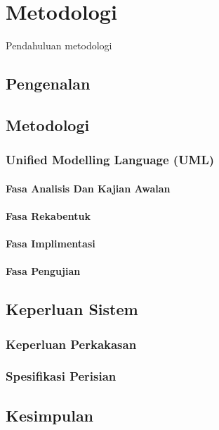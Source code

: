 \chapter{Metodologi}\label{c1}
Pendahuluan metodologi

\section{Pengenalan}

\section{Metodologi}

\subsection{Unified Modelling Language (UML)}

\subsubsection{Fasa Analisis Dan Kajian Awalan}
\subsubsection{Fasa Rekabentuk}
\subsubsection{Fasa Implimentasi}
\subsubsection{Fasa Pengujian}

\section{Keperluan Sistem}

\subsection{Keperluan Perkakasan}
\subsection{Spesifikasi Perisian}

\section{Kesimpulan}